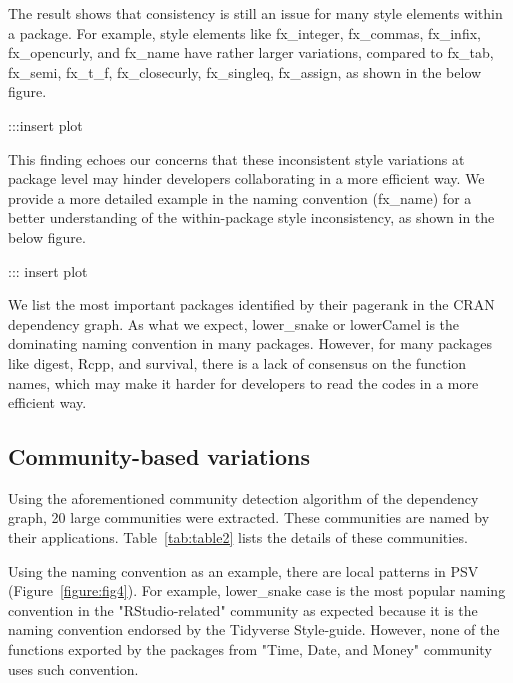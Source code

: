 The result shows that consistency is still an issue for many style elements within a package. For example, style elements like fx_integer, fx_commas, fx_infix, fx_opencurly, and fx_name have rather larger variations, compared to fx_tab, fx_semi, fx_t_f, fx_closecurly, fx_singleq, fx_assign, as shown in the below figure.

:::insert plot

This finding echoes our concerns that these inconsistent style variations at package level may hinder developers collaborating in a more efficient way.  We provide a more detailed example in the naming convention (fx_name) for a better understanding of the within-package style inconsistency, as shown in the below figure.

::: insert plot

We list the most important packages identified by their pagerank in the CRAN dependency graph.  As what we expect, lower_snake or lowerCamel is the dominating naming convention in many packages. However, for many packages like digest, Rcpp, and survival, there is a lack of consensus on the function names, which may make it harder for developers to read the codes in a more efficient way.

\subsection{Community-based variations}

Using the aforementioned community detection algorithm of the dependency graph, 20 large communities were extracted. These communities are named by their applications. Table~\ref{tab:table2} lists the details of these communities.

Using the naming convention as an example, there are local patterns in PSV (Figure~\ref{figure:fig4}). For example, lower\_snake case is the most popular naming convention in the "RStudio-related" community as expected because it is the naming convention endorsed by the Tidyverse Style-guide. However, none of the functions exported by the packages from "Time, Date, and Money" community uses such convention.

